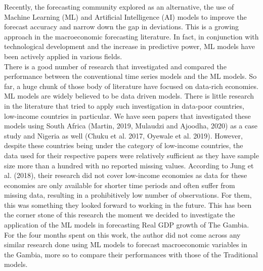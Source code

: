 \documentclass[12pt,italian, twoside]{report}
\begin{document}
Recently, the forecasting community explored as an alternative, the use of Machine Learning (ML) and Artificial Intelligence (AI) models to improve the forecast accuracy and narrow down the gap in deviations. This is a growing approach in the macroeconomic forecasting literature. In fact, in conjunction with technological development and the increase in predictive power, ML models have been actively applied in various fields.
\\
There is a good number of research that investigated and compared the performance between the conventional time series models and the ML models. So far, a huge chunk of those body of literature have focused on data-rich economies. ML models are widely believed to be data driven models. There is little research in the literature that tried to apply such investigation in data-poor countries, low-income countries in particular. We have seen papers that investigated these models using South Africa (Martin, 2019, Mulaudzi and Ajoodha, 2020) as a case study and Nigeria as well (Chuku et al. 2017, Oyewale et al. 2019). However, despite these countries being under the category of low-income countries, the data used for their respective papers were relatively sufficient as they have sample size more than a hundred with no reported missing values. According to Jung et al. (2018), their research did not cover low-income economies as data for these economies are only available for shorter time periods and often suffer from missing data, resulting in a prohibitively low number of observations. For them, this was something they looked forward to working in the future. This has been the corner stone of this research the moment we decided to investigate the application of the ML models in forecasting Real GDP growth of The Gambia. For the four months spent on this work, the author did not come across any similar research done using ML models to forecast macroeconomic variables in the Gambia, more so to compare their performances with those of the Traditional models.
\\
\end{document}
